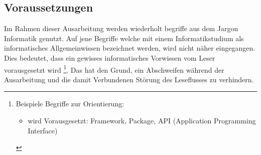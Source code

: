 \subsection{Voraussetzungen} \myCheckmark
Im Rahmen dieser Ausarbeitung werden wiederholt begriffe aus dem Jargon Informatik genutzt. Auf jene Begriffe welche mit einem Informatikstudium als informatisches Allgemeinwissen bezeichnet werden, wird nicht näher eingegangen. Dies bedeutet, dass ein gewisses informatisches Vorwissen vom Leser vorausgesetzt wird%
\footnote{Beispiele Begriffe zur Orientierung:
	\begin{itemize}[noitemsep,topsep=0pt,parsep=0pt,partopsep=0pt]
		\item wird Vorausgesetzt: Framework, Package, API (Application Programming Interface)
	\end{itemize}
	\nointerlineskip %
}. \newline%
Das hat den Grund, ein Abschweifen während der Ausarbeitung und die damit Verbundenen Störung des Leseflusses zu verhindern.

